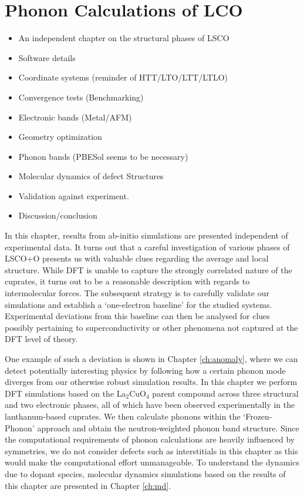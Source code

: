 \chapter{Phonon Calculations of LCO}\label{ch:simulation}

\begin{framed}
	\begin{itemize}
		\item An independent chapter on the structural phases of LSCO
		\item Software details
		\item Coordinate systems (reminder of HTT/LTO/LTT/LTLO)
		\item Convergence tests (Benchmarking)
		\item Electronic bands (Metal/AFM)
		\item Geometry optimization
		\item Phonon bands (PBESol seems to be necessary)
		\item Molecular dynamics of defect Structures
		\item Validation against experiment.
		\item Discussion/conclusion
	\end{itemize}	
\end{framed}

In this chapter, results from ab-initio simulations are presented independent of experimental data. It turns out that a careful investigation of various phases of LSCO+O presents us with valuable clues regarding the average and local structure. While DFT is unable to capture the strongly correlated nature of the cuprates, it turns out to be a reasonable description with regards to intermolecular forces. The subsequent strategy is to carefully validate our simulations and establish a `one-electron baseline' for the studied systems. Experimental deviations from this baseline can then be analysed for clues possibly pertaining to superconductivity or other phenomena not captured at the DFT level of theory.

One example of such a deviation is shown in Chapter \ref{ch:anomaly}, where we can detect potentially interesting physics by following how a certain phonon mode diverges from our otherwise robust simulation results. In this chapter we perform DFT simulations based on the La$_2$CuO$_4$ parent compound across three structural and two electronic phases, all of which have been observed experimentally in the lanthanum-based cuprates. We then calculate phonons within the `Frozen-Phonon' approach and obtain the neutron-weighted phonon band structure. Since the computational requirements of phonon calculations are heavily influenced by symmetries, we do not consider defects such as interstitials in this chapter as this would make the computational effort unmanageable. To understand the dynamics due to dopant species, molecular dynamics simulations based on the results of this chapter are presented in Chapter \ref{ch:md}.

